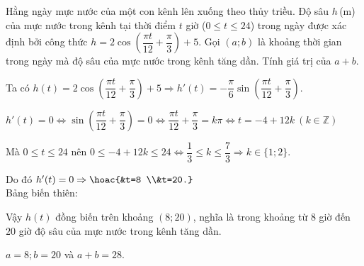 \begin{bt}%
Hằng ngày mực nước của một con kênh lên xuống theo thủy triều. Độ sâu $h$\,(m) của mực nước trong kênh tại thời điểm $t$ giờ ($0 \leq t \leq 24$) trong ngày được xác định bởi công thức $h=2 \cos \left(\dfrac{\pi t}{12}+\dfrac{\pi}{3}\right)+5$. Gọi $(a; b)$ là khoảng thời gian trong ngày mà độ sâu của mực nước trong kênh tăng dần. Tính giá trị của $a+b$.
\loigiai
{Ta có $h(t)=2 \cos \left(\dfrac{\pi t}{12}+\dfrac{\pi}{3}\right)+5 \Rightarrow h'(t)=-\dfrac{\pi}{6} \sin \left(\dfrac{\pi t}{12}+\dfrac{\pi}{3}\right)$.

$h'(t)=0 \Leftrightarrow \sin \left(\dfrac{\pi t}{12}+\dfrac{\pi}{3}\right)=0 \Leftrightarrow \dfrac{\pi t}{12}+\dfrac{\pi}{3}=k \pi \Leftrightarrow t=-4+12 k \ (k \in \mathbb{Z})$

Mà $0 \leq t \leq 24$ nên $0 \leq-4+12k \leq 24 \Leftrightarrow \dfrac{1}{3} \leq k \leq \dfrac{7}{3} \Rightarrow k \in\{1; 2\}$.

Do đó $h'(t)=0 \Rightarrow \hoac{&t=8 \\&t=20.}$\\
Bảng biến thiên:
\begin{center}
\end{center}
Vậy $h(t)$ đồng biến trên khoảng $(8; 20)$, nghĩa là trong khoảng từ $8$ giờ đến $20$ giờ độ sâu của mực nước trong kênh tăng dần.

$a=8; b=20$ và $a+b=28$.
}
\end{bt}


